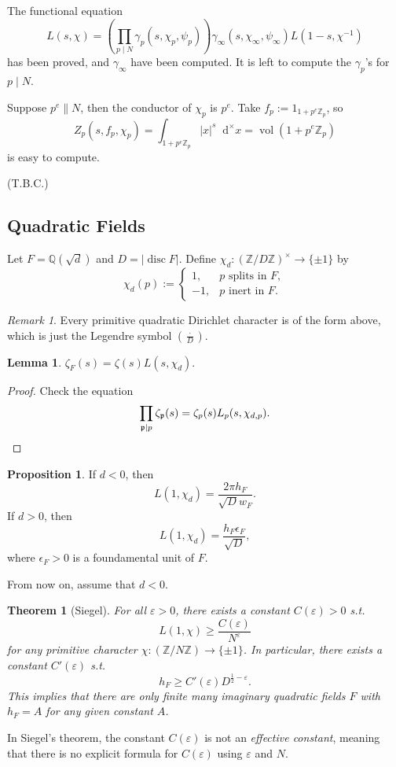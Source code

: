 \documentclass{article}
\newtheorem{theorem}{Theorem}
\theoremstyle{definition}
\newtheorem{proposition}{Proposition}[section]
\newtheorem{lemma}{Lemma}[section]
\theoremstyle{remark}
\newtheorem*{remark}{Remark}
\newcommand{\Q}{\mathbb{Q}}
\newcommand{\Z}{\mathbb{Z}}
\newcommand{\dxm}{\mathop{}\!\mathrm{d}^{\times}x}
\DeclareMathOperator{\vol}{vol}
\newcommand{\frp}{\mathfrak{p}}
\DeclareMathOperator{\disc}{disc}
\begin{document}
The functional equation
\[L(s, \chi) = \left( \prod_{p\mid N}\gamma_p(s, \chi_p, \psi_p) \right)\gamma_\infty(s, \chi_\infty, \psi_\infty)L(1-s, \chi^{-1})\]has been proved, and $\gamma_\infty$ have been computed.
It is left to compute the $\gamma_p$'s for $p\mid N$.

Suppose $p^e\parallel N$,
then the conductor of $\chi_p$ is $p^e$.
Take $f_p := 1_{1+p^e\Z_p}$, so
\[Z_p(s, f_p, \chi_p) = \int_{1+p^e\Z_p}|x|^s\dxm = \vol(1+p^e\Z_p)\]
is easy to compute.

(T.B.C.)


\subsection{Quadratic Fields}
Let $F = \Q(\sqrt{d})$ and $D = |\disc F|$.
Define $\chi_d : (\Z/D\Z)^\times\to \{\pm 1\}$ by \[\chi_d(p) := \begin{cases}
    1,&p\text{ splits in }F,\\
    -1,&p\text{ inert in }F.
\end{cases}\]
\begin{remark}
    Every primitive quadratic Dirichlet character is of the form above, which is just the Legendre symbol $\left( \frac{\cdot}{D} \right)$.
\end{remark}
\begin{lemma}
    $\zeta_F(s) = \zeta(s)L(s, \chi_d)$.
\end{lemma}
\begin{proof}
    Check the equation \[\prod_{\frp\mid p}\zeta_\frp(s) = \zeta_p(s)L_p(s, \chi_{d,p}).\qedhere\]
\end{proof}

\begin{proposition}
    If $d < 0$, then \[L(1, \chi_d) = \frac{2\pi h_F}{\sqrt{D}w_F}.\]
    If $d > 0$, then \[L(1, \chi_d) = \frac{h_F\epsilon_F}{\sqrt{D}},\]
    where $\epsilon_F > 0$ is a foundamental unit of $F$.
\end{proposition}

From now on, assume that $d < 0$.

\begin{theorem}
    [Siegel]
    For all $\varepsilon>0$, there exists a constant $C(\varepsilon) > 0$ s.t. \[L(1, \chi) \ge \frac{C(\varepsilon)}{N^\varepsilon}\] for any primitive character $\chi:(\Z/N\Z)\to\{\pm 1\}$.
    In particular, there exists a constant $C'(\varepsilon)$ s.t. \[h_F \ge C'(\varepsilon)D^{\frac{1}{2}-\varepsilon}.\]
    This implies that there are only finite many imaginary quadratic fields $F$ with $h_F = A$ for any given constant $A$.
\end{theorem}
In Siegel's theorem, the constant $C(\varepsilon)$ is not an \textit{effective constant}, meaning that there is no explicit formula for $C(\varepsilon)$ using $\varepsilon$ and $N$.
\end{document}
